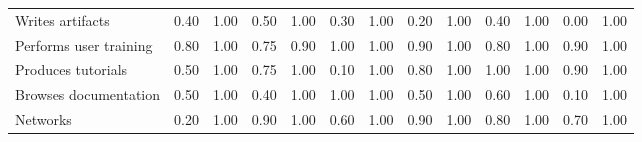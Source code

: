 \begin{tabular}{lrrrrrrrrrrrr}
Writes artifacts & 0.40 & 1.00 & 0.50 & 1.00 & 0.30 & 1.00 & 0.20 & 1.00 & 0.40 & 1.00 & 0.00 & 1.00 \\
Performs user training & 0.80 & 1.00 & 0.75 & 0.90 & 1.00 & 1.00 & 0.90 & 1.00 & 0.80 & 1.00 & 0.90 & 1.00 \\
Produces tutorials & 0.50 & 1.00 & 0.75 & 1.00 & 0.10 & 1.00 & 0.80 & 1.00 & 1.00 & 1.00 & 0.90 & 1.00 \\
Browses documentation & 0.50 & 1.00 & 0.40 & 1.00 & 1.00 & 1.00 & 0.50 & 1.00 & 0.60 & 1.00 & 0.10 & 1.00 \\
Networks & 0.20 & 1.00 & 0.90 & 1.00 & 0.60 & 1.00 & 0.90 & 1.00 & 0.80 & 1.00 & 0.70 & 1.00 \\
\bottomrule
\end{tabular}
